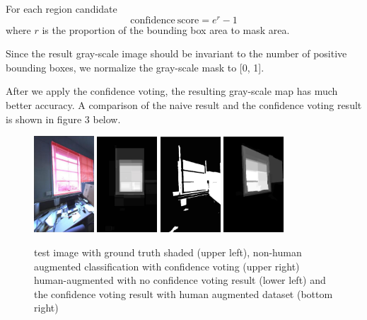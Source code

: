 \documentclass[10pt,twocolumn,letterpaper]{article}
\begin{document}
For each region candidate
\begin{equation}
\mathrm{confidence\ score} = e^{r}-1
\end{equation}
where $r$ is the proportion of the bounding box area to mask area.

Since the result gray-scale image should be invariant to the number of positive bounding boxes, we normalize the gray-scale mask to [0, 1].

After we apply the confidence voting, the resulting gray-scale map has much better accuracy. A comparison of the naive result and the confidence voting result is shown in figure 3 below.

\begin{figure}[h]
\centering
\includegraphics[width=0.2\textwidth]{plots/eg1_original.jpg}
\includegraphics[width=0.2\textwidth]{plots/generalDataDF.jpg}
\includegraphics[width=0.2\textwidth]{plots/eg1_naive.jpg}
\includegraphics[width=0.2\textwidth]{plots/eg1_conf.jpg}
\caption{test image with ground truth shaded (upper left), non-human augmented classification with confidence voting (upper right) human-augmented with no confidence voting result (lower left) and the confidence voting result with human augmented dataset (bottom right)}
\end{figure}
\end{document}
